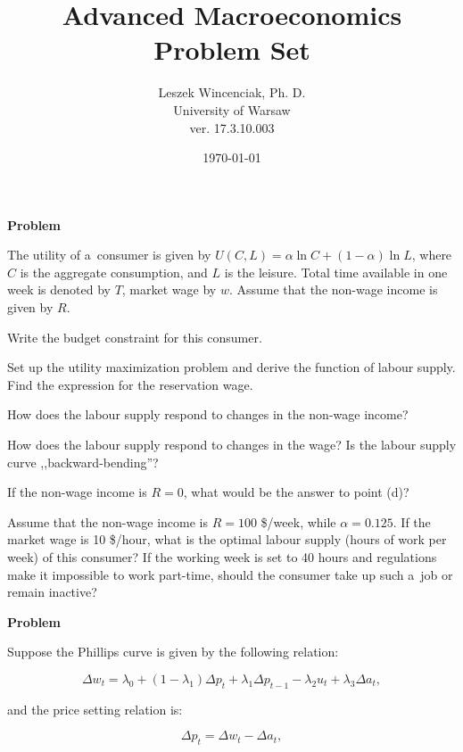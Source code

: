 \documentclass[a4paper, notitlepage, 11pt]{article}
\title{Advanced Macroeconomics Problem Set}
\author{Leszek Wincenciak, Ph. D.\\ University of Warsaw\\ ver. 17.3.10.003}
\date{\today}
\newcounter{zadlicz}[section]%
\newcommand{\tytul}[2]{\setcounter{equation}{0}\addtocounter{zadlicz}{1}\vspace{\abovedisplayskip}\noindent\textbf{#1\ \thezadlicz #2}}%
\begin{document}
\maketitle

\tytul{Problem}{}

\noindent%
The utility of a~consumer is given by $U(C,L)=\alpha\ln C + (1-\alpha)\ln L$, where $C$ is the aggregate consumption, and $L$ is the leisure. Total time available in one week is denoted by $T$, market wage by $w$. Assume that the non-wage income is given by $R$.

\begin{wylicz}
\item Write the budget constraint for this consumer.
\item Set up the utility maximization problem and derive the function of labour supply. Find the expression for the reservation wage.
\item How does the labour supply respond to changes in the non-wage income?
\item How does the labour supply respond to changes in the wage? Is the labour supply curve ,,backward-bending''?
\item If the non-wage income is $R=0$, what would be the answer to point (d)?
\end{wylicz}

Assume that the non-wage income is $R=100$ \$/week, while $\alpha=0.125$. If the market wage is 10 \$/hour, what is the optimal labour supply (hours of work per week) of this consumer? If the working week is set to 40 hours and regulations make it impossible to work part-time, should the consumer take up such a~job or remain inactive?

\tytul{Problem}{}

\noindent%
Suppose the Phillips curve is given by the following relation:

\begin{equation}
\Delta w_t=\lambda_0 + (1-\lambda_1)\Delta p_t + \lambda_1\Delta p_{t-1}-\lambda_2 u_t + \lambda_3\Delta a_t,\label{phillips}
\end{equation}

and the price setting relation is:

\begin{equation}
\Delta p_t=\Delta w_t - \Delta a_t,\label{price}
\end{equation}
\end{document}
